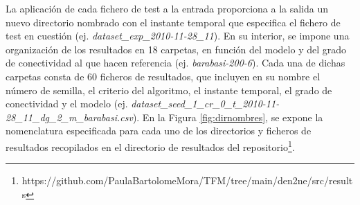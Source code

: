 \vspace{3mm}

La aplicación de cada fichero de test a la entrada proporciona a la salida un nuevo directorio nombrado con el instante temporal que especifica el fichero de test en cuestión (ej. \textit{dataset\_exp\_2010-11-28\_11}). En su interior, se impone una organización de los resultados en 18 carpetas, en función del modelo y del grado de conectividad al que hacen referencia (ej. \textit{barabasi-200-6}). Cada una de dichas carpetas consta de 60 ficheros de resultados, que incluyen en su nombre el número de semilla, el criterio del algoritmo, el instante temporal, el grado de conectividad y el modelo (ej. \textit{dataset\_seed\_1\_cr\_0\_t\_2010-11-28\_11\_dg\_2\_m\_barabasi.csv}). En la Figura \ref{fig:dirnombres}, se expone la nomenclatura especificada para cada uno de los directorios y ficheros de resultados recopilados en el directorio de resultados del repositorio\footnote{https://github.com/PaulaBartolomeMora/TFM/tree/main/den2ne/src/results}.

\vspace{3mm}

